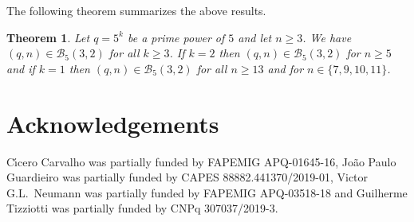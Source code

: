 \documentclass[12pt]{article}
\newtheorem{theorem}{Theorem}[section]
\begin{document}
The following theorem summarizes the above results.

\begin{theorem}
Let $q=5^k$ be a prime power of $5$
and let $n \geq 3$.
We have $(q,n) \in \mathcal{B}_5(3,2)$ for all $k\geq 3$. If 
$k=2$ then $(q,n) \in \mathcal{B}_5(3,2)$ for $n\geq 5$ and
if $k=1$ then $(q,n) \in \mathcal{B}_5(3,2)$ 
for all $n \geq 13$ and for
$n \in \{7,9,10,11\}$.
\end{theorem}


\section*{Acknowledgements}
C\'{\i}cero Carvalho  was partially funded by FAPEMIG APQ-01645-16, Jo\~{a}o 
Paulo Guardieiro was partially funded by CAPES 88882.441370/2019-01, Victor 
G.L.\ Neumann was 
partially funded by FAPEMIG APQ-03518-18 and Guilherme Tizziotti was 
partially funded by 
CNPq 307037/2019-3.
\end{document}
